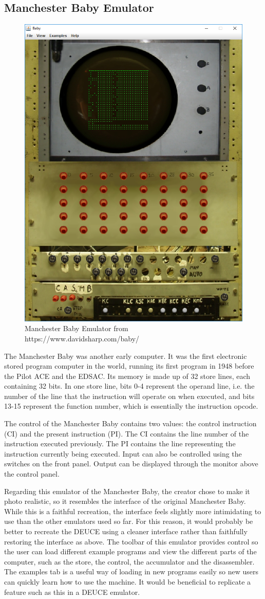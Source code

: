 \documentclass{l4proj}
\begin{document}
\subsection{Manchester Baby Emulator}
\begin{figure}[h!]
	\centering
	\includegraphics[width=0.5\linewidth]{images/baby-emu}
	\caption{Manchester Baby Emulator from https://www.davidsharp.com/baby/}
	\label{fig:baby}
\end{figure}

The Manchester Baby was another early computer. It was the first electronic stored program computer in the world, running its first program in 1948 before the Pilot ACE and the EDSAC. Its memory is made up of 32 store lines, each containing 32 bits. In one store line, bits 0-4 represent the operand line, i.e. the number of the line that the instruction will operate on when executed, and bits 13-15 represent the function number, which is essentially the instruction opcode.

The control of the Manchester Baby contains two values: the control instruction (CI) and the present instruction (PI). The CI contains the line number of the instruction executed previously. The PI contains the line representing the instruction currently being executed. Input can also be controlled using the switches on the front panel. Output can be displayed through the monitor above the control panel.

Regarding this emulator of the Manchester Baby, the creator chose to make it photo realistic, so it resembles the interface of the original Manchester Baby. While this is a faithful recreation, the interface feels slightly more intimidating to use than the other emulators used so far. For this reason, it would probably be better to recreate the DEUCE using a cleaner interface rather than faithfully restoring the interface as above.
The toolbar of this emulator provides control so the user can load different example programs and view the different parts of the computer, such as the store, the control, the accumulator and the disassembler. The examples tab is a useful way of loading in new programs easily so new users can quickly learn how to use the machine. It would be beneficial to replicate a feature such as this in a DEUCE emulator.
\end{document}
